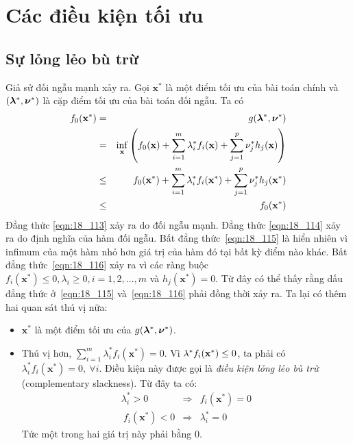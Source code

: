 \section{Các điều kiện tối ưu}
\subsection{Sự lỏng lẻo bù trừ}
Giả sử đối ngẫu mạnh xảy ra. Gọi $\mathbf{x}^*$ là một điểm
tối ưu của bài toán chính và $(\boldsymbol{\lambda}^*, \boldsymbol{\nu}^*)$ là cặp điểm tối ưu của bài toán đối ngẫu. Ta có
\begin{eqnarray}
\label{eqn:18_113}
f_0(\mathbf{x}^*) &=& g(\boldsymbol{\lambda}^*,\boldsymbol{\nu}^*) \\
\label{eqn:18_114}
&=& \inf_{\mathbf{x}} \left(f_0(\mathbf{x}) + \sum_{i=1}^m \lambda_i^* f_i(\mathbf{x}) + \sum_{j=1}^p \nu_j^* h_j(\mathbf{x})\right)\\
\label{eqn:18_115}
&\leq& f_0(\mathbf{x}^*) + \sum_{i=1}^m \lambda_i^* f_i(\mathbf{x}^*) + \sum_{j=1}^p \nu_j^* h_j(\mathbf{x}^*) \\
\label{eqn:18_116}
&\leq& f_0(\mathbf{x}^*)
\end{eqnarray}
Đẳng thức \eqref{eqn:18_113} xảy ra do đối ngẫu mạnh. Đẳng thức
\eqref{eqn:18_114} xảy ra do định nghĩa của hàm đối ngẫu. Bất đẳng
thức~\eqref{eqn:18_115} là hiển nhiên vì infimum của một hàm nhỏ hơn giá trị của
hàm đó tại bất kỳ điểm nào khác. Bất đẳng thức~\eqref{eqn:18_116} xảy ra vì
các ràng buộc $f_i(\mathbf{x}^*) \leq 0, \lambda_i \geq 0, i = 1, 2, \dots, m$
và $h_j(\mathbf{x}^*) = 0$. Từ đây có thể thấy rằng dấu đẳng thức
ở~\eqref{eqn:18_115} và~\eqref{eqn:18_116} phải đồng thời xảy ra. Ta lại có
thêm hai quan sát thú vị nữa:
\begin{itemize}
\item $\mathbf{x}^*$ là một điểm tối ưu của $g(\boldsymbol{\lambda}^*, \boldsymbol{\nu}^*)$.

\item Thú vị hơn, $\displaystyle \sum_{i=1}^m \lambda_i^* f_i(\mathbf{x}^*)
= 0$. Vì $\lambda^*f_i(\mathbf{x}^*) \leq 0$, ta phải có
$\lambda_i^*f_i(\mathbf{x}^*) = 0,~\forall i$.
Điều kiện này được gọi là \textit{điều kiện lỏng lẻo bù trừ} (complementary slackness). Từ đây ta có:
\begin{eqnarray}
\lambda_i^* > 0 &\Rightarrow& f_i(\mathbf{x}^*) = 0 \\\
f_i(\mathbf{x}^*) < 0 &\Rightarrow& \lambda_i^* = 0
\end{eqnarray}
Tức một trong hai giá trị này phải bằng 0.
\end{itemize}

